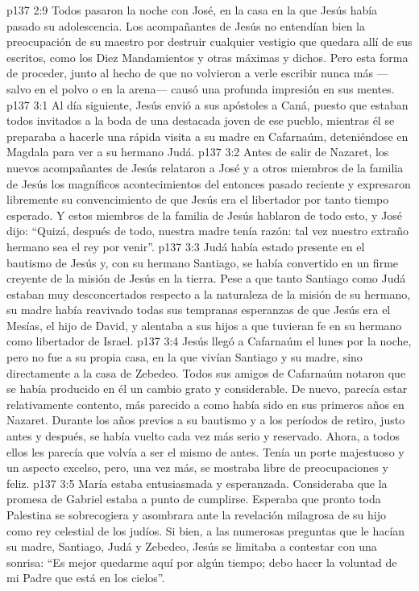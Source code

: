 \vs p137 2:9 Todos pasaron la noche con José, en la casa en la que Jesús había pasado su adolescencia. Los acompañantes de Jesús no entendían bien la preocupación de su maestro por destruir cualquier vestigio que quedara allí de sus escritos, como los Diez Mandamientos y otras máximas y dichos. Pero esta forma de proceder, junto al hecho de que no volvieron a verle escribir nunca más ---salvo en el polvo o en la arena--- causó una profunda impresión en sus mentes.
\vs p137 3:1 Al día siguiente, Jesús envió a sus apóstoles a Caná, puesto que estaban todos invitados a la boda de una destacada joven de ese pueblo, mientras él se preparaba a hacerle una rápida visita a su madre en Cafarnaúm, deteniéndose en Magdala para ver a su hermano Judá.
\vs p137 3:2 Antes de salir de Nazaret, los nuevos acompañantes de Jesús relataron a José y a otros miembros de la familia de Jesús los magníficos acontecimientos del entonces pasado reciente y expresaron libremente su convencimiento de que Jesús era el libertador por tanto tiempo esperado. Y estos miembros de la familia de Jesús hablaron de todo esto, y José dijo: “Quizá, después de todo, nuestra madre tenía razón: tal vez nuestro extraño hermano sea el rey por venir”.
\vs p137 3:3 Judá había estado presente en el bautismo de Jesús y, con su hermano Santiago, se había convertido en un firme creyente de la misión de Jesús en la tierra. Pese a que tanto Santiago como Judá estaban muy desconcertados respecto a la naturaleza de la misión de su hermano, su madre había reavivado todas sus tempranas esperanzas de que Jesús era el Mesías, el hijo de David, y alentaba a sus hijos a que tuvieran fe en su hermano como libertador de Israel.
\vs p137 3:4 \pc Jesús llegó a Cafarnaúm el lunes por la noche, pero no fue a su propia casa, en la que vivían Santiago y su madre, sino directamente a la casa de Zebedeo. Todos sus amigos de Cafarnaúm notaron que se había producido en él un cambio grato y considerable. De nuevo, parecía estar relativamente contento, más parecido a como había sido en sus primeros años en Nazaret. Durante los años previos a su bautismo y a los períodos de retiro, justo antes y después, se había vuelto cada vez más serio y reservado. Ahora, a todos ellos les parecía que volvía a ser el mismo de antes. Tenía un porte majestuoso y un aspecto excelso, pero, una vez más, se mostraba libre de preocupaciones y feliz.
\vs p137 3:5 María estaba entusiasmada y esperanzada. Consideraba que la promesa de Gabriel estaba a punto de cumplirse. Esperaba que pronto toda Palestina se sobrecogiera y asombrara ante la revelación milagrosa de su hijo como rey celestial de los judíos. Si bien, a las numerosas preguntas que le hacían su madre, Santiago, Judá y Zebedeo, Jesús se limitaba a contestar con una sonrisa: “Es mejor quedarme aquí por algún tiempo; debo hacer la voluntad de mi Padre que está en los cielos”.
